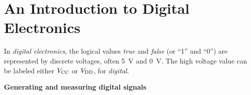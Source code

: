 \section{An Introduction to Digital Electronics}
\label{lab_digital_electronics}
\pagestyle{labfancy} %

\bigskip

In \textit{digital electronics}, the logical values \textit{true} and \textit{false} (or ``1'' and ``0'')  are represented by discrete voltages, often 5~V and 0~V.  The high voltage value can be labeled either $V_{\rm CC}$ or $V_{\rm DD}$, for \textit{digital}.

\medskip
\textbf{Generating and measuring digital signals}%
